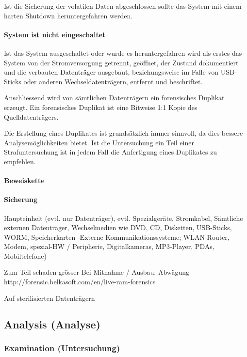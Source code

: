 Ist die Sicherung der volatilen Daten abgeschlossen sollte das System mit einem harten Shutdown heruntergefahren werden.

\paragraph{System ist nicht eingeschaltet}
Ist das System ausgeschaltet oder wurde es heruntergefahren wird als erstes das System von der Stromversorgung getrennt, geöffnet, der Zustand dokumentiert und die verbauten Datenträger ausgebaut, beziehungsweise im Falle von USB-Sticks oder anderen Wechseldatenträgern, entfernt und beschriftet. 

Anschliessend wird von sämtlichen Datenträgern ein forensisches Duplikat erzeugt. Ein forensisches Duplikat ist eine Bitweise 1:1 Kopie des Quelldatenträgers.

Die Erstellung eines Duplikates ist grundsätzlich immer sinnvoll, da dies bessere Analysemöglichkeiten bietet. Ist die Untersuchung ein Teil einer Strafuntersuchung ist in jedem Fall die Anfertigung eines Duplikates zu empfehlen.


\paragraph{Beweiskette}


\paragraph{Sicherung}
Haupteinheit (evtl. nur Datenträger), evtl. Spezialgeräte, Stromkabel, Sämtliche externen Datenträger, Wechselmedien wie DVD, CD, Disketten, USB-Sticks, WORM, Speicherkarten 
-Externe Kommunikationssysteme; WLAN-Router, Modem, spezial-HW / Peripherie, Digitalkameras, MP3-Player, PDAs, Mobiltelefone)

Zum Teil schaden grösser Bei Mitnahme / Ausbau, Abwägung
http://forensic.belkasoft.com/en/live-ram-forensics

Auf sterilisierten Datenträgern


\subsection{Analysis (Analyse)}

\subsubsection{Examination (Untersuchung)}

